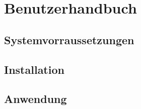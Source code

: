 \part{Benutzerhandbuch}
\chapter{Systemvorraussetzungen}

\chapter{Installation}
\chapter{Anwendung}